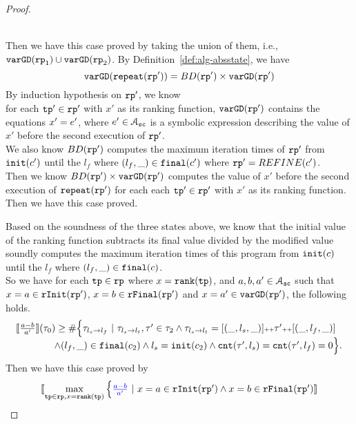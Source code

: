 \begin{proof}
\begin{itemize}
\\
Then we have this case proved by taking the union of them, i.e., $\mathtt{varGD}(\mathtt{rp}_1) \cup \mathtt{varGD}(\mathtt{rp}_2)$.
 By Definition~\ref{def:alg-absstate}, we have
\[
  \mathtt{varGD}(\mathtt{repeat}(\mathtt{rp}')) =  BD(\mathtt{rp}')  \times
  {\ensuremath{\mathtt{varGD}}(\ensuremath{\mathtt{rp}}')}
\]
By induction hypothesis on $\mathtt{rp}'$, we know
\\
for each $\mathtt{tp}' \in \mathtt{rp}'$ with $x'$ as its ranking function,
$\mathtt{varGD}(\mathtt{rp}')$ contains the equations $x' = e'$, where $e' \in \mathcal{A}_{\mathtt{sc}}$ is a
symbolic expression describing the value of $x'$ before the second execution of $\mathtt{rp}'$.
\\
We also know $BD(\mathtt{rp}')$ computes the maximum iteration times of $\mathtt{rp}'$ from $\mathtt{init}(c')$ until the $l_f$ where $(l_f, \_) \in \mathtt{final}(c')$ where $\mathtt{rp}' = REFINE(c')$.
\\
Then we know $BD(\mathtt{rp}')  \times
{\ensuremath{\mathtt{varGD}}(\ensuremath{\mathtt{rp}}')}$
computes the value of $x'$ before the second execution of $\mathtt{repeat}(\mathtt{rp}')$ for each each $\mathtt{tp}' \in \mathtt{rp}'$ with $x'$ as its ranking function.
\\
Then we have this case proved.
\end{itemize}
Based on the soundness of the three states above, we know that the initial value of the ranking function
subtracts its final value divided by the modified value soundly computes the maximum iteration times of this program from $\mathtt{init}(c)$ until the $l_f$ where $(l_f, \_) \in \mathtt{final}(c)$.
\\
So we have for each $\mathtt{tp} \in \mathtt{rp}$ where $x = \mathtt{rank}(\mathtt{tp})$,
and $a, b, a ' \in \mathcal{A}_{\mathtt{sc}}$
such that $x = a \in \mathtt{rInit}(\mathtt{rp}')$, $x = b \in \mathtt{rFinal}(\mathtt{rp}')$ and $x = a' \in \mathtt{varGD}(\mathtt{rp}')$,
the following holds.
\[
  \begin{array}{l}
  \llbracket \frac{a - b}{a'} \rrbracket(\mathtt{\tau}_0) \geq
    \# \Big\{\mathtt{\tau}_{l_s \to l_f} ~\vert~ \mathtt{\tau}_{l_s \to l_t}, \mathtt{\tau}' \in \mathtt{\tau}_2 \land \mathtt{\tau}_{l_s \to l_t} = [(\_, l_s, \_)] {\scriptscriptstyle ++} \mathtt{\tau}' {\scriptscriptstyle ++} [(\_, l_f, \_)]
    \\ \qquad \qquad
    \land (l_{f}, \_) \in \mathtt{final}(c_2)
    \land l_s = \mathtt{init}(c_2)
    \land \mathtt{cnt}(\mathtt{\tau}', l_s) = \mathtt{cnt}(\mathtt{\tau}', l_f) = 0 
    \Big\}.
    \end{array}
\]
Then we have this case proved by
\[
  \begin{array}{l}
    \econfig{
      \max\limits_{\tpath \in \rprog, x = \locbound(\tpath)}
    \Big\{ \highlight{\frac{a - b}{a'}} ~\vert~ x = a \in \rfinit(\rprog')
    \land x = b \in \rffinal(\rprog') 
}
\end{array}\]
\end{proof}
